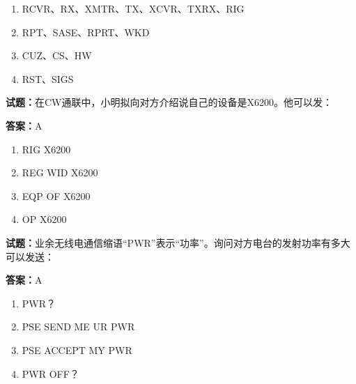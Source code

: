 \documentclass{ctexbook}
\begin{document}
\begin{enumerate}[leftmargin=3em]
  \item RCVR、RX、XMTR、TX、XCVR、TXRX、RIG 

  \item RPT、SASE、RPRT、WKD 

  \item CUZ、CS、HW 

  \item RST、SIGS 

\end{enumerate}






\vspace{1em}

\textbf{试题：}在CW通联中，小明拟向对方介绍说自己的设备是X6200。他可以发： 

\textbf{答案：}A 

\begin{enumerate}[leftmargin=3em]
  \item RIG X6200 

  \item REG WID X6200 

  \item EQP OF X6200 

  \item OP X6200 

\end{enumerate}





\vspace{1em}

\textbf{试题：}业余无线电通信缩语“PWR”表示“功率”。询问对方电台的发射功率有多大可以发送： 

\textbf{答案：}A 

\begin{enumerate}[leftmargin=3em]
  \item PWR？ 

  \item PSE SEND ME UR PWR 

  \item PSE ACCEPT MY PWR 

  \item PWR OFF？ 

\end{enumerate}
\end{document}

